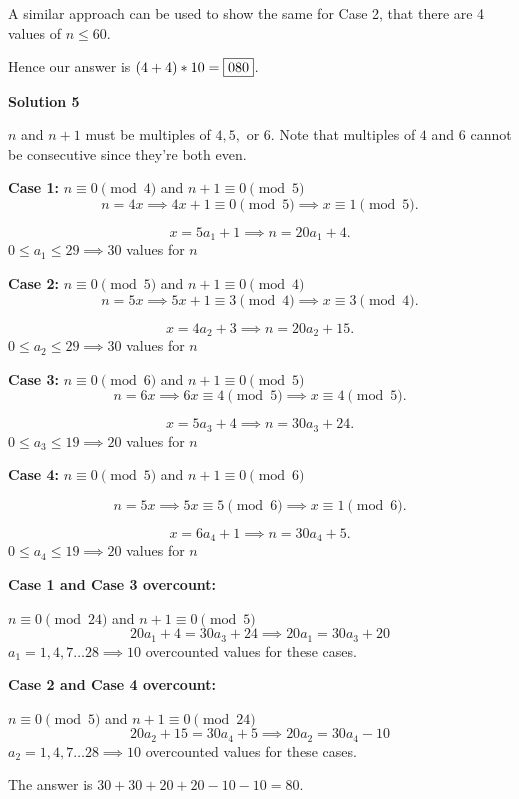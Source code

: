\begin{enumerate}
 A similar approach can be used to show the same for Case 2, that there are 4 values of $n \le 60$.

 Hence our answer is $(4+4)*10 = \fbox{080}$.

 



\textbf{Solution 5}

$n$ and $n + 1$ must be multiples of $4, 5,$ or $6.$ Note that multiples of $4$ and $6$ cannot be consecutive since they're both even.  

 
\textbf{Case 1:} $n \equiv 0 \pmod{4}$ and $n + 1 \equiv 0 \pmod{5}$
 \[n = 4x \implies 4x + 1 \equiv 0 \pmod{5} \implies x \equiv 1\pmod{5}.\]

 \[x = 5a_1 + 1 \implies n = 20a_1 + 4.\]
$0 \leq a_1 \leq 29 \implies 30$ values for $n$ 

 
\textbf{Case 2:} $n \equiv 0 \pmod{5}$ and $n + 1 \equiv 0 \pmod{4}$
 \[n = 5x \implies 5x + 1 \equiv 3 \pmod{4} \implies x \equiv 3\pmod{4}.\]

 \[x = 4a_2 + 3 \implies n = 20a_2 + 15.\]
$0 \leq a_2 \leq 29 \implies 30$ values for $n$ 

 
\textbf{Case 3:} $n \equiv 0 \pmod{6}$ and $n + 1 \equiv 0 \pmod{5}$
 \[n = 6x \implies 6x \equiv 4 \pmod{5} \implies x \equiv 4\pmod{5}.\]

 \[x = 5a_3 + 4 \implies n = 30a_3 + 24.\]
$0 \leq a_3 \leq 19 \implies 20$ values for $n$ 

 \textbf{Case 4:} $n \equiv 0 \pmod{5}$ and $n + 1 \equiv 0 \pmod{6}$

 \[n = 5x \implies 5x \equiv 5 \pmod{6} \implies x \equiv 1\pmod{6}.\]

 \[x = 6a_4 + 1 \implies n = 30a_4 + 5.\]
$0 \leq a_4 \leq 19 \implies 20$ values for $n$ 

 
\textbf{Case 1 and Case 3 overcount:} 

 $n \equiv 0 \pmod{24}$ and $n + 1 \equiv 0 \pmod{5}$
 \[20a_1 + 4 = 30a_3 + 24 \implies 20a_1 = 30a_3 + 20\] $a_1 = 1,4,7 \dots 28 \implies 10$ overcounted values for these cases. 

 
\textbf{Case 2 and Case 4 overcount:} 

 $n \equiv 0 \pmod{5}$ and $n + 1 \equiv 0 \pmod{24}$
 \[20a_2 + 15 = 30a_4 + 5 \implies 20a_2 = 30a_4 -10\] $a_2 = 1,4,7 \dots 28 \implies 10$ overcounted values for these cases. 

 
The answer is $30 + 30 + 20 + 20 - 10 - 10 = \boxed{80}.$





\end{enumerate}
